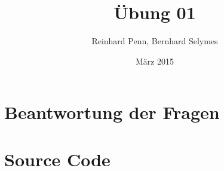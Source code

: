 \documentclass[12pt,a4paper]{article}
\begin{document}
\title{Übung 01}
\author{Reinhard Penn, Bernhard Selymes}
\date{März 2015}

\normalsize




\newcommand{\Uebung}{BFMVHDL}
\newcommand{\srcpath}{../../src}
\newcommand{\simpath}{../../sim}



\section{Beantwortung der Fragen}

\section{Source Code}






\end{document}
